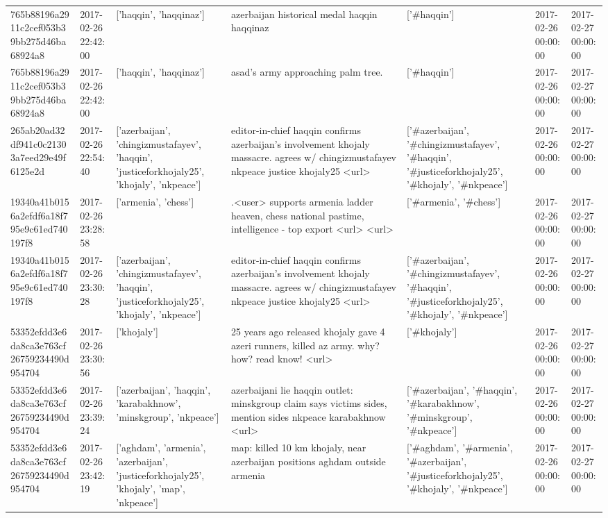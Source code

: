 \begin{tabular}{lllllll}
765b88196a2911c2cef053b39bb275d46ba68924a8 & 2017-02-26 22:42:00 & ['haqqin', 'haqqinaz'] & azerbaijan historical medal haqqin haqqinaz & ['#haqqin'] & 2017-02-26 00:00:00 & 2017-02-27 00:00:00 \\
765b88196a2911c2cef053b39bb275d46ba68924a8 & 2017-02-26 22:42:00 & ['haqqin', 'haqqinaz'] & asad's army approaching palm tree. & ['#haqqin'] & 2017-02-26 00:00:00 & 2017-02-27 00:00:00 \\
265ab20ad32df941c0c21303a7eed29e49f6125e2d & 2017-02-26 22:54:40 & ['azerbaijan', 'chingizmustafayev', 'haqqin', 'justiceforkhojaly25', 'khojaly', 'nkpeace'] & editor-in-chief haqqin confirms azerbaijan's involvement khojaly massacre. agrees w/ chingizmustafayev nkpeace justice khojaly25 <url> & ['#azerbaijan', '#chingizmustafayev', '#haqqin', '#justiceforkhojaly25', '#khojaly', '#nkpeace'] & 2017-02-26 00:00:00 & 2017-02-27 00:00:00 \\
19340a41b0156a2efdf6a18f795e9c61ed740197f8 & 2017-02-26 23:28:58 & ['armenia', 'chess'] & .<user> supports armenia ladder heaven, chess national pastime, intelligence - top export <url> <url> & ['#armenia', '#chess'] & 2017-02-26 00:00:00 & 2017-02-27 00:00:00 \\
19340a41b0156a2efdf6a18f795e9c61ed740197f8 & 2017-02-26 23:30:28 & ['azerbaijan', 'chingizmustafayev', 'haqqin', 'justiceforkhojaly25', 'khojaly', 'nkpeace'] & editor-in-chief haqqin confirms azerbaijan's involvement khojaly massacre. agrees w/ chingizmustafayev nkpeace justice khojaly25 <url> & ['#azerbaijan', '#chingizmustafayev', '#haqqin', '#justiceforkhojaly25', '#khojaly', '#nkpeace'] & 2017-02-26 00:00:00 & 2017-02-27 00:00:00 \\
53352efdd3e6da8ca3e763cf26759234490d954704 & 2017-02-26 23:30:56 & ['khojaly'] & 25 years ago released khojaly gave 4 azeri runners, killed az army. why? how? read know! <url> & ['#khojaly'] & 2017-02-26 00:00:00 & 2017-02-27 00:00:00 \\
53352efdd3e6da8ca3e763cf26759234490d954704 & 2017-02-26 23:39:24 & ['azerbaijan', 'haqqin', 'karabakhnow', 'minskgroup', 'nkpeace'] & azerbaijani lie haqqin outlet: minskgroup claim says victims sides, mention sides nkpeace karabakhnow <url> & ['#azerbaijan', '#haqqin', '#karabakhnow', '#minskgroup', '#nkpeace'] & 2017-02-26 00:00:00 & 2017-02-27 00:00:00 \\
53352efdd3e6da8ca3e763cf26759234490d954704 & 2017-02-26 23:42:19 & ['aghdam', 'armenia', 'azerbaijan', 'justiceforkhojaly25', 'khojaly', 'map', 'nkpeace'] & map: killed 10 km khojaly, near azerbaijan positions aghdam outside armenia & ['#aghdam', '#armenia', '#azerbaijan', '#justiceforkhojaly25', '#khojaly', '#nkpeace'] & 2017-02-26 00:00:00 & 2017-02-27 00:00:00 \\

\end{tabular}
